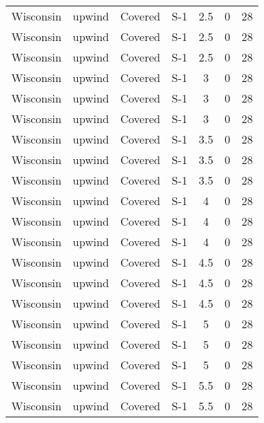 \documentclass{article}
\begin{document}
\begin{longtable}[c]{ccccccc}
Wisconsin & upwind    & Covered     & S-1             & 2.5          & 0           & 28  \\
Wisconsin & upwind    & Covered     & S-1             & 2.5          & 0           & 28  \\
Wisconsin & upwind    & Covered     & S-1             & 2.5          & 0           & 28  \\
Wisconsin & upwind    & Covered     & S-1             & 3            & 0           & 28  \\
Wisconsin & upwind    & Covered     & S-1             & 3            & 0           & 28  \\
Wisconsin & upwind    & Covered     & S-1             & 3            & 0           & 28  \\
Wisconsin & upwind    & Covered     & S-1             & 3.5          & 0           & 28  \\
Wisconsin & upwind    & Covered     & S-1             & 3.5          & 0           & 28  \\
Wisconsin & upwind    & Covered     & S-1             & 3.5          & 0           & 28  \\
Wisconsin & upwind    & Covered     & S-1             & 4            & 0           & 28  \\
Wisconsin & upwind    & Covered     & S-1             & 4            & 0           & 28  \\
Wisconsin & upwind    & Covered     & S-1             & 4            & 0           & 28  \\
Wisconsin & upwind    & Covered     & S-1             & 4.5          & 0           & 28  \\
Wisconsin & upwind    & Covered     & S-1             & 4.5          & 0           & 28  \\
Wisconsin & upwind    & Covered     & S-1             & 4.5          & 0           & 28  \\
Wisconsin & upwind    & Covered     & S-1             & 5            & 0           & 28  \\
Wisconsin & upwind    & Covered     & S-1             & 5            & 0           & 28  \\
Wisconsin & upwind    & Covered     & S-1             & 5            & 0           & 28  \\
Wisconsin & upwind    & Covered     & S-1             & 5.5          & 0           & 28  \\
Wisconsin & upwind    & Covered     & S-1             & 5.5          & 0           & 28  \\

\end{longtable}
\end{document}
